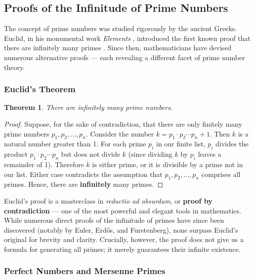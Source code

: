 \documentclass[11pt]{article}
\theoremstyle{plain}
\newtheorem{theorem}{Theorem}
\theoremstyle{definition}
\theoremstyle{remark}
\begin{document}
\subsection{Proofs of the Infinitude of Prime Numbers}

\par The concept of prime numbers was studied rigorously by the ancient Greeks. Euclid, in his monumental work \textit{Elements} \cite{euclid_elements_ix20}, introduced the first known proof that there are infinitely many primes \cite{britannica_prime}. Since then, mathematicians have devised numerous alternative proofs --- each revealing a different facet of prime number theory.

\subsubsection{Euclid's Theorem}
\begin{theorem}
	\label{thm:eucthm}
	There are infinitely many prime numbers.
\end{theorem}
\begin{proof}
	Suppose, for the sake of contradiction, that there are only finitely many prime numbers $p_1, p_2, \ldots, p_n$. Consider the number $k = p_1 \cdot p_2 \cdots p_n + 1$. Then $k$ is a natural number greater than 1. For each prime $p_i$ in our finite list, $p_i$ divides the product $p_1 \cdot p_2 \cdots p_n$ but does not divide $k$ (since dividing $k$ by $p_i$ leaves a remainder of 1). Therefore $k$ is either prime, or it is divisible by a prime not in our list. Either case contradicts the assumption that $p_1, p_2, \ldots, p_n$ comprises all primes. Hence, there are \textbf{infinitely} many primes.
\end{proof}

\par Euclid's proof is a masterclass in \textit{reductio ad absurdum}, or \textbf{proof by contradiction} — one of the most powerful and elegant tools in mathematics. While numerous direct proofs of the infinitude of primes have since been discovered (notably by Euler, Erd\H{o}s, and Furstenberg), none surpass Euclid's original for brevity and clarity. Crucially, however, the proof does not give us a formula for generating all primes; it merely guarantees their infinite existence.

\subsubsection{Perfect Numbers and Mersenne Primes}
\end{document}
